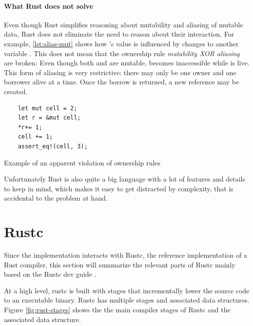 \documentclass[twoside, english, final]{sdqthesis}
\theoremstyle{definition}
\begin{document}
\paragraph*{What Rust does not solve} Even though Rust simplifies reasoning about mutability and aliasing of mutable data, Rust does not eliminate the need to reason about their interaction. For example, \cref{lst:alias-mut} shows how 's value is influenced by changes to another variable . This does not mean that the ownership rule  \textit{mutability XOR aliasing} are broken: Even though both  and  are mutable,  becomes inaccessible while  is live.
This form of aliasing is very restrictive: there may only be one owner and one borrower alive at a time. Once the borrow is returned, a new reference may be created.

\begin{listing}[h]
  \begin{verbatim}
    let mut cell = 2;
    let r = &mut cell;
    *r+= 1;
    cell += 1;
    assert_eq!(cell, 3);
  \end{verbatim}
  \caption{Example of an apparent violation of ownership rules}
  \label{lst:alias-mut}
\end{listing}

Unfortunately Rust is also quite a big language with a lot of features and details to keep in mind, which makes it easy to get distracted by complexity, that is accidental to the problem at hand.

\section{Rustc}

Since the implementation interacts with Rustc, the reference implementation of a Rust compiler, this section will summarize the relevant parts of Rustc mainly based on the Rustc dev guide \cite{noauthor_overview_nodate}.

At a high level, rustc is built with stages that incrementally lower the source code to an executable binary. Rustc has multiple stages and associated data structures. 
Figure \ref{fig:rust-stages} shows the the main compiler stages of Rustc and the associated data structure.
\end{document}
